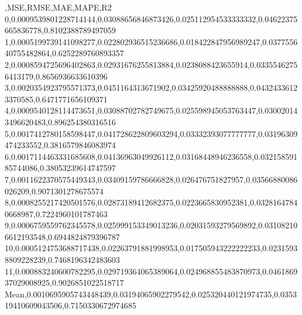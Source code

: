 ,MSE,RMSE,MAE,MAPE,R2
0,0.0009539801228714144,0.03088656846873426,0.025112954533333332,0.04622375665836778,0.8102388789497059
1,0.0005199739141098277,0.022802936515236686,0.018422847956989247,0.037755640755482864,0.6252289760893357
2,0.0008594725696402863,0.02931676255813884,0.0238088423655914,0.03355462756413179,0.8656936633610396
3,0.0020354923795571373,0.0451164313671902,0.03425920488888888,0.04324336123370585,0.6471771656109371
4,0.0009540128114473651,0.03088702782749675,0.025598945053763447,0.030020143496620483,0.896254380316516
5,0.0017412780158598447,0.041728622809603294,0.03332393077777777,0.03196309474233552,0.3816579846083974
6,0.0017114463331685608,0.04136963049926112,0.03168448946236558,0.03215859185744086,0.38053239614747597
7,0.0011622370575449343,0.03409159786666828,0.026476751827957,0.03566880086026209,0.9071301278675574
8,0.0008255217420501576,0.02873189412682375,0.0223665830952381,0.03281647840668987,0.7224960101787463
9,0.0006759559762345578,0.025999153349013236,0.02031593279569892,0.031082106612193548,0.6944824879396787
10,0.0005124753688717438,0.02263791881998953,0.017505943222222233,0.02315938809228239,0.7468196342483603
11,0.000883240600782295,0.029719364065389064,0.024968855483870973,0.046186937029008925,0.9026851022518717
Mean,0.0010695905743448439,0.03194065902279542,0.025320440121974735,0.035319410609043506,0.7150330672974685
